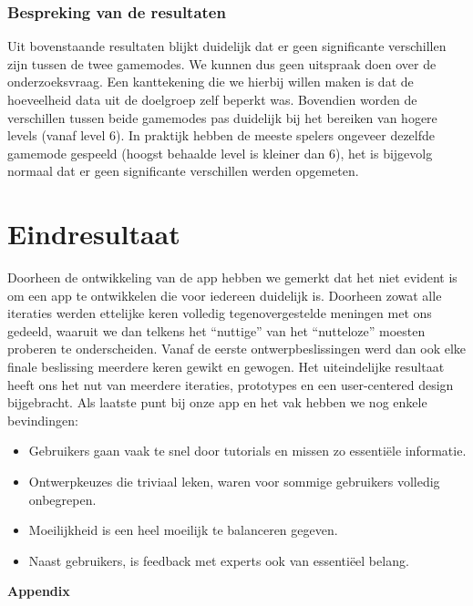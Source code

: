 \documentclass[11pt]{article}
\begin{document}
\subsubsection{Bespreking van de resultaten}
Uit bovenstaande resultaten blijkt duidelijk dat er geen significante verschillen zijn tussen de twee gamemodes. We kunnen dus geen uitspraak doen over de onderzoeksvraag. Een kanttekening die we hierbij willen maken is dat de hoeveelheid data uit de doelgroep zelf beperkt was. Bovendien worden de verschillen tussen beide gamemodes pas duidelijk bij het bereiken van hogere levels (vanaf level 6). In praktijk hebben de meeste spelers ongeveer dezelfde gamemode gespeeld (hoogst behaalde level is kleiner dan 6), het is bijgevolg normaal dat er geen significante verschillen werden opgemeten.

\clearpage
\section{Eindresultaat}
\noindent
Doorheen de ontwikkeling van de app hebben we gemerkt dat het niet evident is om een app te ontwikkelen die voor iedereen duidelijk is. Doorheen zowat alle iteraties werden ettelijke keren volledig tegenovergestelde meningen met ons gedeeld, waaruit we dan telkens het ``nuttige'' van het ``nutteloze'' moesten proberen te onderscheiden. Vanaf de eerste ontwerpbeslissingen werd dan ook elke finale beslissing meerdere keren gewikt en gewogen. Het uiteindelijke resultaat heeft ons het nut van meerdere iteraties, prototypes en een user-centered design bijgebracht. Als laatste punt bij onze app en het vak hebben we nog enkele bevindingen:

\begin{itemize}	
	\item Gebruikers gaan vaak te snel door tutorials en missen zo essenti\"ele informatie.
    \item Ontwerpkeuzes die triviaal leken, waren voor sommige gebruikers volledig onbegrepen.
    \item Moeilijkheid is een heel moeilijk te balanceren gegeven.
    \item Naast gebruikers, is feedback met experts ook van essenti\"eel belang.
\end{itemize}

\clearpage
\newpage
{}
\renewcommand*{\thepage}{Appendix p.~\arabic{page}}
\appendix
\begin{center}
	\huge{\textbf{Appendix}}
\end{center}
\end{document}
